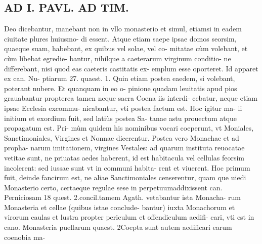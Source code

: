 \documentclass{article}
\begin{document}
\begin{pages}
\section*{AD I. PAVL. AD TIM. }
\marginpar{[ p.292 ]}\pstart Deo dicebantur, manebant non in vllo monasterio et simul, etiamsi in eadem ciuitate plures huiusmo- di essent. Atque etiam saepe ipsae domos seorsim, quaeque suam, habebant, ex quibus vel solae, vel co- mitatae cùm volebant, et cùm libebat egredie- bantur, nihilque a caeterarum virginum conditio- ne differebant, nisi quod eas caeteris castitatis ex- emplum esse oporteret. Id apparet ex can. Nu- ptiarum 27. quaest. 1. Quin etiam postea eaedem, si volebant, poterant nubere. Et quanquam in eo o- pinione quadam leuitatis apud pios grauabantur propterea tamen neque sacra Coena iis interdi- cebatur, neque etiam ipsae Ecclesia excommu- nicabantur, vti postea factum est. Hoc igitur ma- li initium et exordium fuit, sed latiùs postea Sa- tanae astu prouectum atque propagatum est. Pri- mùm quidem his nominibus vocari coeperunt, vt Moniales, Sanctimoniales, Virgines et Nonnae dicerentur. Postea vero Monachae et ad propha- narum imitationem, virgines Vestales: ad quarum instituta reuocatae vetitae sunt, ne priuatas aedes haberent, id est habitacula vel cellulas feorsim incolerent: sed iussae sunt vt in communi habita- rent et viuerent. Hoc primum fuit, deinde fancirum est, ne aliae Sanctimoniales censerentur, quam que uiedi Monasterio certo, certaeque  regulae sese in perpetuumaddixissent can. Perniciosam 18 quest. 2.concil.tamem Agath. vetabantur ista Monacha- rum Monasteria et cellae (quibus istae conclude- bantur) iuxta Monachorum et virorum caulas et lustra propter periculum et offendiculum aedifi- cari, vti est in cano. Monasteria puellarum quaest. 2Coepta sunt autem aedificari earum coenobia ma-  \pend

\end{pages}
\end{document}
